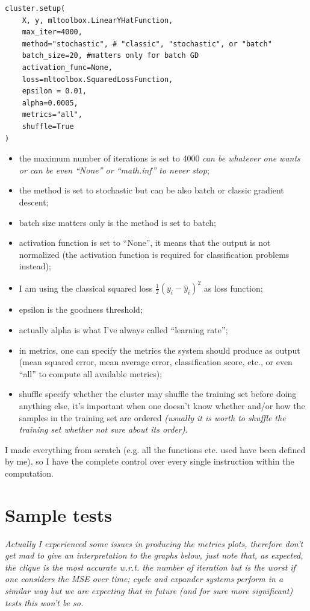 \documentclass[a4paper,12pt]{article}
\theoremstyle{newplanestyle}
\theoremstyle{newdefinitionstyle}
\theoremstyle{newprovestyle}
\begin{document}
\begin{lstlisting}
cluster.setup(
    X, y, mltoolbox.LinearYHatFunction,
    max_iter=4000,
    method="stochastic", # "classic", "stochastic", or "batch"
    batch_size=20, #matters only for batch GD
    activation_func=None,
    loss=mltoolbox.SquaredLossFunction,
    epsilon = 0.01,
    alpha=0.0005,
    metrics="all",
    shuffle=True
)
\end{lstlisting}

\begin{itemize}
\item the maximum number of iterations is set to 4000 \textit{can be whatever one wants or can be even ``None'' or ``math.inf'' to never stop};
\item the method is set to stochastic but can be also batch or classic gradient descent;
\item batch size matters only is the method is set to batch;
\item activation function is set to ``None'', it means that the output is not normalized (the activation function is required for classification problems instead);
\item I am using the classical squared loss $\frac{1}{2}(y_i - \hat{y}_i)^2$ as loss function;
\item epsilon is the goodness threshold;
\item actually alpha is what I've always called ``learning rate'';
\item in metrics, one can specify the metrics the system should produce as output (mean squared error, mean average error, classification score, etc., or even ``all'' to compute all available metrics);
\item shuffle specify whether the cluster may shuffle the training set before doing anything else, it's important when one doesn't know whether and/or how the samples in the training set are ordered \textit{(usually it is worth to shuffle the training set whether not sure about its order)}.
\end{itemize}


I made everything from scratch (e.g. all the functions etc. used have been defined by me), so I have the complete control over every single instruction within the computation.

\section*{Sample tests}
\textit{Actually I experienced some issues in producing the metrics plots, therefore don't get mad to give an interpretation to the graphs below, just note that, as expected, the clique is the most accurate w.r.t. the number of iteration but is the worst if one considers the MSE over time; cycle and expander systems perform in a similar way but we are expecting that in future (and for sure more significant) tests this won't be so.}
\end{document}
